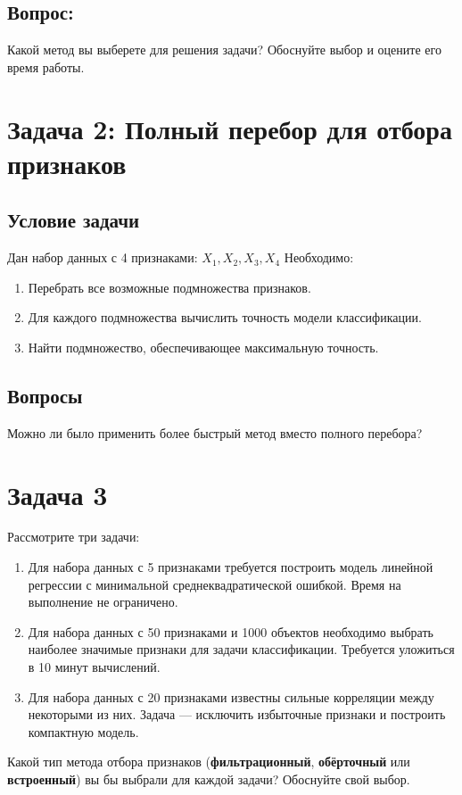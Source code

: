 \subsection*{Вопрос:} Какой метод вы выберете для решения задачи? Обоснуйте выбор и оцените его время работы.
\section*{Задача 2: Полный перебор для отбора признаков}

\subsection*{Условие задачи}
Дан набор данных с 4 признаками: $X_1, X_2, X_3, X_4$
Необходимо:  
\begin{enumerate}
    \item Перебрать все возможные подмножества признаков.
    \item Для каждого подмножества вычислить точность модели классификации.
    \item Найти подмножество, обеспечивающее максимальную точность.
\end{enumerate}

\subsection*{Вопросы}
 Можно ли было применить более быстрый метод вместо полного перебора?

 \section*{Задача 3}

Рассмотрите три задачи:  
\begin{enumerate}
    \item Для набора данных с 5 признаками требуется построить модель линейной регрессии с минимальной среднеквадратической ошибкой. Время на выполнение не ограничено.  
    \item Для набора данных с 50 признаками и 1000 объектов необходимо выбрать наиболее значимые признаки для задачи классификации. Требуется уложиться в 10 минут вычислений.  
    \item Для набора данных с 20 признаками известны сильные корреляции между некоторыми из них. Задача — исключить избыточные признаки и построить компактную модель.  
\end{enumerate}

Какой тип метода отбора признаков (\textbf{фильтрационный}, \textbf{обёрточный} или \textbf{встроенный}) вы бы выбрали для каждой задачи? Обоснуйте свой выбор.
